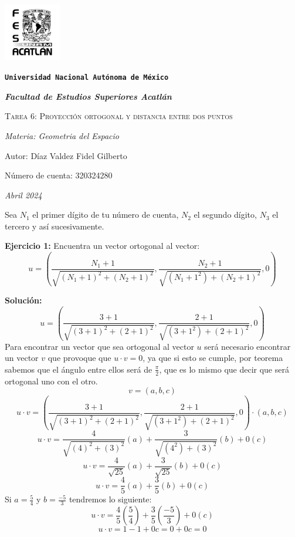 \documentclass{article}
\begin{document}
\begin{titlepage}
   \centering  
   {\includegraphics[width=2.5cm]{logo.png}\par}
   {\texttt{\bfseries \LARGE Universidad Nacional Autónoma de México} \par}
   \vspace{1cm}
   {\itshape \Large \bfseries Facultad de Estudios Superiores Acatlán \par}
   \vspace{3cm}
   {\scshape \Huge Tarea 6: Proyección ortogonal y distancia entre dos puntos \par}
   \vspace {3cm}
   {\slshape \Large Materia: Geometria del Espacio \par}
   \vspace{2cm}
   {\Large Autor: Díaz Valdez Fidel Gilberto\par}
   {\Large Número de cuenta: 320324280\par}
   \vfill
   {\itshape Abril 2024 \par}
\end{titlepage}


Sea $N_1$ el primer dígito de tu número de cuenta, $N_2$ el segundo dígito, $N_3$ el tercero y así
sucesivamente.
\vspace{10pt}




\textbf{Ejercicio 1:} Encuentra un vector ortogonal al vector:
$$u = (\frac{N_1+1}{\sqrt{(N_1+1)^2+ (N_2+1)^2}}, \frac{N_2+1}{\sqrt{(N_1+1^2)+ (N_2+1)^2}} , 0)$$


\textbf{Solución:}
$$u = (\frac{3+1}{\sqrt{(3+1)^2+ (2+1)^2}}, \frac{2+1}{\sqrt{(3+1^2)+ (2+1)^2}} , 0)$$
Para encontrar un vector que sea ortogonal al vector $u$ será necesario encontrar un vector $v$ que provoque que $u \cdot v =0$, ya que
si esto se cumple, por teorema sabemos que el ángulo entre ellos será de $\frac{\pi}{2}$, que es lo mismo que decir que será
ortogonal uno con el otro.
   $$v = (a, b, c)$$
   $$u \cdot v = (\frac{3+1}{\sqrt{(3+1)^2+ (2+1)^2}}, \frac{2+1}{\sqrt{(3+1^2)+ (2+1)^2}} , 0) \cdot (a, b,c )$$
   $$u \cdot v = \frac{4}{\sqrt{(4)^2+ (3)^2}} (a) + \frac{3}{\sqrt{(4^2)+ (3)^2}}(b) + 0(c)$$
   $$u \cdot v = \frac{4}{\sqrt{25}} (a) + \frac{3}{\sqrt{25}}(b) + 0(c)$$
   $$u \cdot v = \frac{4}{5} (a) + \frac{3}{5}(b) + 0(c)$$
Si $a = \frac{5}{4}$ y $b = \frac{-5}{3}$ tendremos lo siguiente:
$$u \cdot v = \frac{4}{5}(\frac{5}{4}) + \frac{3}{5}(\frac{-5}{3}) + 0(c)$$
$$u \cdot v = 1 -1 + 0c = 0 + 0c = 0 $$
\end{document}
